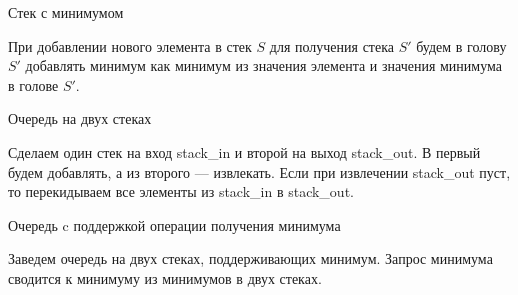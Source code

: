 \begin{center}
Стек с минимумом
\end{center}

При добавлении нового элемента в стек $S$ для получения стека $S'$
будем в голову $S'$ добавлять минимум как минимум из значения
элемента и значения минимума в голове $S'$.

\begin{center}
Очередь на двух стеках
\end{center}

Сделаем один стек на вход stack\_in и второй на выход stack\_out. В
первый будем добавлять, а из второго — извлекать.
Если при извлечении stack\_out пуст, то перекидываем все элементы
из stack\_in в stack\_out.

\begin{center}
Очередь c поддержкой операции получения минимума
\end{center}
Заведем очередь на двух стеках, поддерживающих минимум.
Запрос минимума сводится к минимуму из минимумов в двух стеках.

\pagebreak